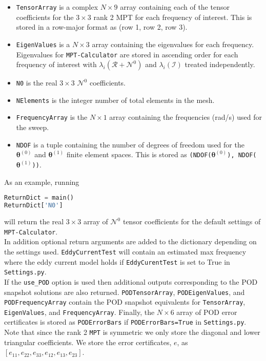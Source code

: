 \begin{itemize}

\item \texttt{TensorArray} is a complex $N\times 9$ array containing each of the tensor coefficients for the $3\times 3$ rank 2 MPT for each frequency of interest. This is stored in a row-major format as (row 1, row 2, row 3). 
\item \texttt{EigenValues} is a $N\times 3$ array containing the eigenvalues for each frequency. Eigenvalues for \texttt{MPT-Calculator} are stored in ascending order for each frequency of interest with $\lambda_i(\mathcal{R} + \mathcal{N}^0)$ and $\lambda_i(\mathcal{I})$ treated independently. 
\item \texttt{N0} is the real $3\times 3$ $\mathcal{N}^0$ coefficients.
\item \texttt{NElements} is the integer number of total elements in the mesh.
\item \texttt{FrequencyArray} is the $N\times 1$ array containing the frequencies (rad/s) used for the sweep.
\item \texttt{NDOF} is a tuple containing the number of degrees of freedom used for the $\boldsymbol{\theta}^{(0)}$ and $\boldsymbol{\theta}^{(1)}$ finite element spaces. This is stored as \texttt{(NDOF($\boldsymbol{\theta}^{(0)}$), NDOF($\boldsymbol{\theta}^{(1)}$))}.

\end{itemize}

\noindent
As an example, running

\begin{lstlisting}[language=Python]
ReturnDict = main()
ReturnDict['N0']
\end{lstlisting}
\noindent
will return the real $3\times 3$ array of $\mathcal{N}^0$ tensor coefficients for the default settings of \texttt{MPT-Calculator}.\\

\noindent
In addition optional return arguments are added to the dictionary depending on the settings used.
\texttt{EddyCurrentTest} will contain an estimated max frequency where the eddy current model holds if \texttt{EddyCurentTest} is set to True in \texttt{Settings.py}.\\

\noindent
If the \texttt{use\_POD} option is used then additional outputs corresponding to the POD snapshot solutions are also returned. \texttt{PODTensorArray}, \texttt{PODEigenValues}, and \texttt{PODFrequencyArray} contain the POD snapshot equivalents for \texttt{TensorArray}, \texttt{EigenValues}, and \texttt{FrequencyArray}. Finally, the $N\times 6$ array of POD error certificates is stored as \texttt{PODErrorBars} if \texttt{PODErrorBars=True} in \texttt{Settings.py}. Note that since the rank 2 \texttt{MPT} is symmetric we only store the diagonal and lower triangular coefficients. We store the error certificates, $e$, as $[e_{11}, e_{22}, e_{33}, e_{12}, e_{13}, e_{23}]$.

